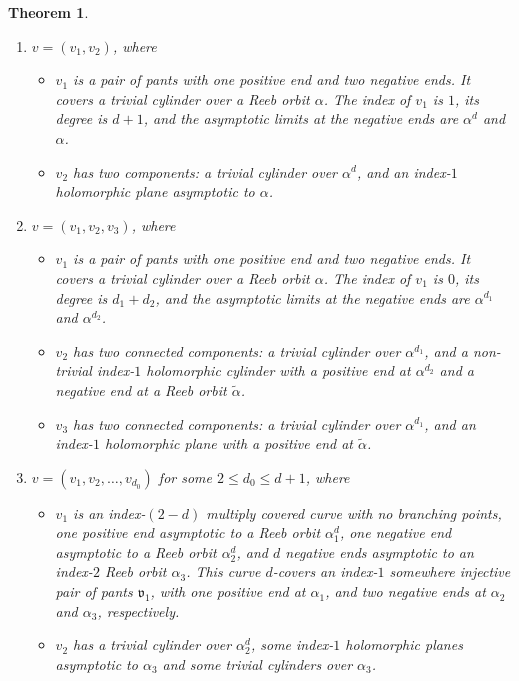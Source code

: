 \documentclass{amsart}
\newtheorem{theorem}{Theorem}[section]
\begin{document}
\begin{theorem}
\begin{itemize}
\begin{enumerate}[label=(iii.\arabic*)]
   \item \label{itm:iv} $v=(v_1,v_2)$, where
    \begin{itemize}
     \item $v_1$  is a pair of pants with one positive end and two negative ends. It covers a trivial cylinder over a Reeb orbit $\alpha$. The index of $v_1$ is $1$, its degree is $d + 1$, and the asymptotic limits at the negative ends are  $\alpha^{d}$ and $\alpha$.
   \item $v_2$ has two components:  a trivial cylinder over $\alpha^{d}$, and an index-$1$ holomorphic plane asymptotic to $\alpha$.
    \end{itemize}

   \item \label{itm:v} $v=(v_1,v_2,v_3)$, where
    \begin{itemize}
   \item $v_1$  is a pair of pants with one positive end and two negative ends. It covers a trivial cylinder over a Reeb orbit $\alpha$. The index of $v_1$ is $0$, its degree is $d_1 + d_2$, and the asymptotic limits at the negative ends are  $\alpha^{d_1}$ and $\alpha^{d_2}$.
   \item $v_2$ has two connected components:  a trivial cylinder over $\alpha^{d_1}$, and a non-trivial index-$1$ holomorphic cylinder with a positive end at $\alpha^{d_2}$ and a negative end at a Reeb orbit $\widetilde \alpha$.
   \item $v_3$ has two connected components:  a trivial cylinder over $\alpha^{d_1}$, and an index-$1$ holomorphic plane with a positive end at  $\widetilde{\alpha}$.
    \end{itemize}
    
   \item \label{itm:vi} $v=(v_1,v_2, \ldots, v_{d_0})$ for some $2\leq d_0 \leq d+1$, where
   \begin{itemize}
   \item $v_1$ is an index-$(2-d)$ multiply covered curve with no branching points, one positive end asymptotic to a Reeb orbit $\alpha_1^d$, one negative end asymptotic to a Reeb orbit $\alpha_2^d$, and $d$ negative ends asymptotic to an index-$2$ Reeb orbit $\alpha_3$. This curve $d$-covers an index-$1$ somewhere injective pair of pants  $\mathfrak{v}_1$, with one positive end at  $\alpha_1$, and two negative ends at $\alpha_2$ and $\alpha_3$, respectively.
   
   \item $v_2$ has a trivial cylinder over $\alpha_2^d$, some index-$1$ holomorphic planes asymptotic to $\alpha_3$ and some trivial cylinders over $\alpha_3$.


\end{itemize}
\end{enumerate}
\end{itemize}
\end{theorem}
\end{document}
